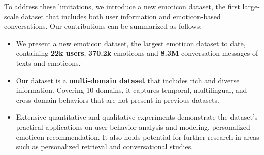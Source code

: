 To address these limitations, we introduce a new emoticon dataset, the first large-scale dataset that includes both user information and emoticon-based conversations. Our contributions can be summarized as follows:
\begin{itemize}
    \item We present a new emoticon dataset, the largest emoticon dataset to date, containing \textbf{22k users}, \textbf{370.2k} emoticons and \textbf{8.3M} conversation messages of texts and emoticons.
    \item
    Our dataset is a \textbf{multi-domain dataset} that includes rich and diverse information. Covering 10 domains, it captures temporal, multilingual, and cross-domain behaviors that are not present in previous datasets.
    \item Extensive quantitative and qualitative experiments demonstrate the dataset’s practical applications on user behavior analysis and modeling, personalized emoticon recommendation. It also holds potential for further research in areas such as personalized retrieval and conversational studies.
\end{itemize}


